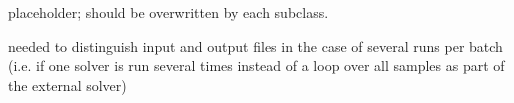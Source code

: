\documentclass[letterpaper,10pt,english]{sphinxmanual}
\begin{document}
\begin{fulllineitems}

\begin{fulllineitems}
\label{\detokenize{solver:solver.solver.Batch.n_runs}}
\end{fulllineitems}


\begin{fulllineitems}
\label{\detokenize{solver:solver.solver.Batch.prepare}}
placeholder; should be overwritten by each subclass.

\end{fulllineitems}


\begin{fulllineitems}
\label{\detokenize{solver:solver.solver.Batch.run_id}}
needed to distinguish input and output files 
in the case of several runs per batch (i.e. if one solver is
run several times instead of a loop over all samples as part 
of the external solver)

\end{fulllineitems}


\end{fulllineitems}

\end{document}
